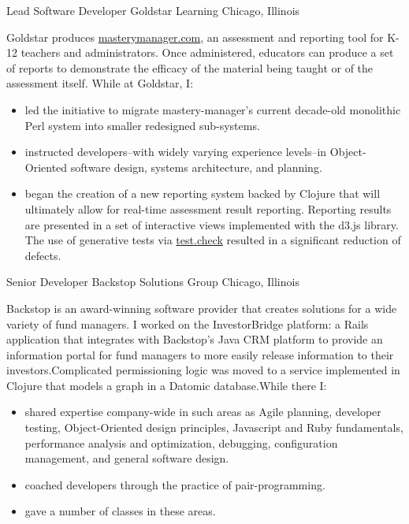 \documentclass[11pt,letterpaper]{moderncv}
\begin{document}
 {Lead Software Developer} {Goldstar
  Learning} {Chicago, Illinois} {} { %
  Goldstar produces \href{https://www.masterymanager.com}{masterymanager.com},
  an assessment and reporting tool for K-12 teachers and administrators.  Once
  administered, educators can produce a set of reports to demonstrate the
  efficacy of the material being taught or of the assessment itself.  While at
  Goldstar, I:
  \begin{itemize}
  \item led the initiative to migrate mastery-manager's current decade-old
    monolithic Perl system into smaller redesigned sub-systems.
  \item instructed developers--with widely varying experience
    levels--in Object-Oriented software design, systems architecture,
    and planning.
  \item began the creation of a new reporting system backed by
    Clojure that will ultimately allow for real-time assessment
    result reporting.  Reporting results are presented in a set of
    interactive views implemented with the d3.js library.  The use of
    generative tests via
    \href{https://github.com/clojure/test.check}{test.check} resulted
    in a significant reduction of defects.
  \end{itemize}
}

 {Senior Developer} {Backstop Solutions Group} {Chicago, Illinois} {} {%
  Backstop is an award-winning software provider that creates solutions for a
  wide variety of fund managers.  I worked on the InvestorBridge platform: a
  Rails application that integrates with Backstop's Java CRM platform to
  provide an information portal for fund managers to more easily release
  information to their investors.\newline Complicated permissioning logic was moved
  to a service implemented in Clojure that models a graph in a Datomic
  database.\newline While there I:
  \begin{itemize}
  \item shared expertise company-wide in such areas as Agile planning,
    developer testing, Object-Oriented design principles, Javascript
    and Ruby fundamentals, performance analysis and optimization,
    debugging, configuration management, and general software design.
  \item coached developers through the practice of pair-programming.
  \item gave a number of classes in these areas.
  \end{itemize}
}
\end{document}
